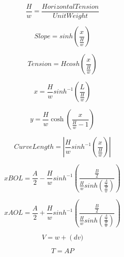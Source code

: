 \documentclass{article}
\begin{document}
\[ \frac{H}{w} = \frac{HorizontalTension}{UnitWeight} \]
\pagebreak

\[ Slope = sinh \left( \frac{x}{\frac{H}{w}} \right) \]
\pagebreak

\[ Tension = H cosh \left( \frac{x}{\frac{H}{w}} \right) \]
\pagebreak

\[ x = \frac{H}{w} sinh^{-1} \left(\frac{L}{\frac{H}{w}}\right) \]
\pagebreak

\[ y = \frac{H}{w} \cosh \left(\frac{x}{\frac{H}{w}-1}\right) \]
\pagebreak

\[ CurveLength = \left| \frac{H}{w} sinh^{-1} \left(\frac{x}{\frac{H}{w}}\right) \right| \]
\pagebreak

\[ xBOL = \frac{A}{2} - \frac{H}{w} sinh^{-1} \left( \frac{\frac{B}{2}}{ \frac{H}{w} sinh \left( \frac{\frac{A}{2}}{\frac{H}{w}} \right)} \right) \]
\pagebreak

\[ xAOL = \frac{A}{2} + \frac{H}{w} sinh^{-1} \left( \frac{\frac{B}{2}}{ \frac{H}{w} sinh \left( \frac{\frac{A}{2}}{\frac{H}{w}} \right)} \right) \]
\pagebreak

\[ V = w + \left(dv) \]
\pagebreak

\[ T = AP \]
\pagebreak
\end{document}
